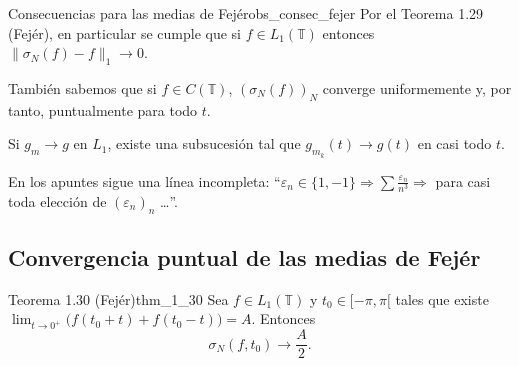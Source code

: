 \begin{observacion}{Consecuencias para las medias de Fejér}{obs_consec_fejer}
Por el Teorema 1.29 (Fejér), en particular se cumple que si $f \in L_1(\mathbb{T})$ entonces $\|\sigma_N(f) - f\|_1 \to 0$.

También sabemos que si $f \in C(\mathbb{T})$, $(\sigma_N(f))_N$ converge uniformemente y, por tanto, puntualmente para todo $t$.

Si $g_m \to g$ en $L_1$, existe una subsucesión tal que $g_{m_k}(t) \to g(t)$ en casi todo $t$.

En los apuntes sigue una línea incompleta: ``$\varepsilon_n \in \{1,-1\} \Rightarrow \sum \frac{\varepsilon_n}{n^3} \Rightarrow$ para casi toda elección de $(\varepsilon_n)_n$ \dots''.
\end{observacion}

\subsection{Convergencia puntual de las medias de Fejér}

\begin{teorema}{Teorema 1.30 (Fejér)}{thm_1_30}
Sea $f \in L_1(\mathbb{T})$ y $t_0 \in [-\pi,\pi[$ tales que existe $\displaystyle\lim_{t\to 0^+}\big(f(t_0+t) + f(t_0-t)\big) = A$. Entonces
\[
\sigma_N(f,t_0) \to \frac{A}{2}.
\]
\end{teorema}

